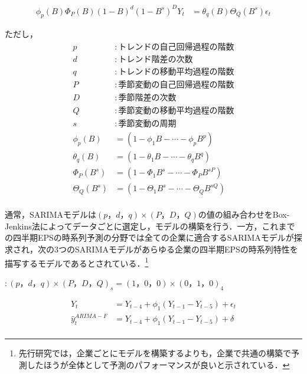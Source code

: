 \documentclass[a4paper，12pt]{jsarticle}
\begin{document}
\begin{equation}
  \begin{split}
    \phi_p(B)\Phi_{P}(B)(1-B)^d(1-B^s)^DY_t &= \theta_q(B)\Theta_Q(B^s)\epsilon_t
  \end{split}
\end{equation}

ただし，
\begin{equation}
  \begin{split}
    p &: トレンドの自己回帰過程の階数 \\
    d &: トレンド階差の次数 \\
    q &: トレンドの移動平均過程の階数 \\
    P &: 季節変動の自己回帰過程の階数 \\
    D &: 季節階差の次数 \\
    Q &: 季節変動の移動平均過程の階数 \\
    s &: 季節変動の周期 \\
    \phi_p(B) &= (1 - \phi_1B - \cdots - \phi_pB^p) \\
    \theta_q(B) &= (1 - \theta_1B - \cdots - \theta_qB^q) \\
    \Phi_P(B^s) &= (1 - \Phi_1B^s - \cdots - \Phi_PB^{sP}) \\
    \Theta_Q(B^s) &= (1 - \Theta_1B^s - \cdots - \Theta_QB^{sQ}) \\
  \end{split}
\end{equation}

通常，SARIMAモデルは$(p，d，q) \times (P，D，Q)$の値の組み合わせをBox-Jenkins法によってデータごとに選定し，モデルの構築を行う．一方，これまでの四半期EPSの時系列予測の分野では全ての企業に適合するSARIMAモデルが探求され，次の3つのSARIMAモデル\citep*{foster1977quarterly, griffin1977time, brown1979univariate}があらゆる企業の四半期EPSの時系列特性を描写するモデルであるとされている．\footnote{先行研究では，企業ごとにモデルを構築するよりも，企業で共通の構築で予測したほうが全体として予測のパフォーマンスが良いと示されている．}

\cite{foster1977quarterly} $: (p，d，q) \times (P，D，Q)_s = (1，0，0) \times (0，1，0)_4$

\begin{equation}
  \begin{split}
    Y_t &= Y_{t-4} + \phi_1(Y_{t-1} - Y_{t-5}) + \epsilon_t \\
    \hat{y}_t^{ARIMA-F} &= Y_{t-4} + \phi_1(Y_{t-1} - Y_{t-5}) + \delta \\
  \end{split}
\end{equation}
\end{document}
